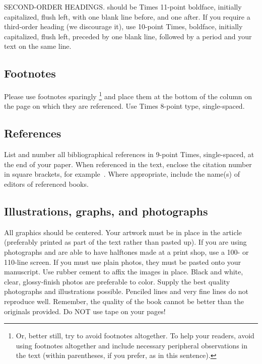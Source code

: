 \documentclass[10pt,twocolumn]{IEEEtran}
\begin{document}
SECOND-ORDER HEADINGS.
should be Times 11-point boldface, initially capitalized, flush left,
with one blank line before, and one after. If you require a third-order
heading (we discourage it), use 10-point Times, boldface, initially
capitalized, flush left, preceded by one blank line, followed by a period
and your text on the same line.

\subsection{Footnotes}

Please use footnotes sparingly%
\footnote
   {%
     Or, better still, try to avoid footnotes altogether.  To help your
     readers, avoid using footnotes altogether and include necessary
     peripheral observations in the text (within parentheses, if you
     prefer, as in this sentence).
   }
and place them at the bottom of the column on the page on which they are
referenced. Use Times 8-point type, single-spaced.


\subsection{References}

List and number all bibliographical references in 9-point Times,
single-spaced, at the end of your paper. When referenced in the text,
enclose the citation number in square brackets, for example~\cite{ex1,ex2}.
Where appropriate, include the name(s) of editors of referenced books.

\subsection{Illustrations, graphs, and photographs}

All graphics should be centered. Your artwork must be in place in the
article (preferably printed as part of the text rather than pasted up).
If you are using photographs and are able to have halftones made at a
print shop, use a 100- or 110-line screen. If you must use plain photos,
they must be pasted onto your manuscript. Use rubber cement to affix the
images in place. Black and white, clear, glossy-finish photos are
preferable to color. Supply the best quality photographs and
illustrations possible. Penciled lines and very fine lines do not
reproduce well. Remember, the quality of the book cannot be better than
the originals provided. Do NOT use tape on your pages!
\end{document}
